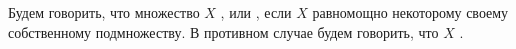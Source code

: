 Будем говорить, что множество $X$ , или
, если $X$ равномощно некоторому своему собственному подмножеству. В
противном случае будем говорить, что $X$ .

